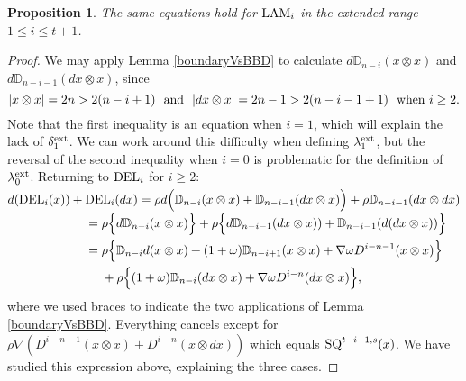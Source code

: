 \documentclass[11pt]{amsart} \renewcommand{\baselinestretch}{1.2}
\theoremstyle{plain}
\newtheorem{prop}[thm]{Proposition}
\theoremstyle{definition}
\newcommand{\twist}{\omega}
\newcommand{\Nabla}{\nabla}
\begin{document}
\begin{second quadrant homotopy sseq operations}
\begin{prop}
The same equations hold for $\textup{LAM}_i$ in the extended range $1\leq i\leq t+1$.
\end{prop}
\begin{proof}
We may apply Lemma \ref{boundaryVsBBD} to calculate $d\mathbb{D}_{n-i}(x\otimes x)$ and $d\mathbb{D}_{n-i-1}(dx\otimes x)$, since 
\[|x\otimes x|=2n> 2(n-i+1)\textup{ \ and \ }|dx\otimes x|=2n-1> 2(n-i-1+1) \textup{ \ when $i\geq2$}.\]
Note that the first inequality is an equation when  $i=1$, which will explain the lack of $\delta^\textup{ext}_1$. We can work around this difficulty when defining $\lambda^\textup{ext}_1$, but the reversal of the second inequality when $i=0$ is problematic for the definition of $\lambda^\textup{ext}_0$. Returning to $\textup{DEL}_i$ for $i\geq2$:
\begin{alignat*}{2}
d(\textup{DEL}_i(x))+{}& \textup{DEL}_i(dx)
=
\smash{\rho d\Bigl(\mathbb{D}_{n-i}(x\otimes x)+\mathbb{D}_{n-i-1}(dx\otimes x)\Bigr)}+\rho\mathbb{D}_{n-i-1}(dx\otimes dx)%
\\
&=
\rho\Bigl\{d\mathbb{D}_{n-i}(x\otimes x)\Bigr\}+\rho\Bigl\{d\mathbb{D}_{n-i-1}(dx\otimes x))+\mathbb{D}_{n-i-1}(d(dx\otimes x))\Bigr\}%
\\
&=
\rho\Bigl\{\mathbb{D}_{n-i}d(x\otimes x)+(1+\twist)\mathbb{D}_{n-i+1}(x\otimes x)+\Nabla\twist D^{i-n-1}(x\otimes x)\Bigr\}
\\
&\ \ \ \ +\rho\Bigl\{(1+\twist)\mathbb{D}_{n-i}(dx\otimes x)+\Nabla\twist D^{i-n}(dx\otimes x)\Bigr\},
\end{alignat*}
where we used braces to indicate the two applications of Lemma \ref{boundaryVsBBD}.
Everything cancels except for $\rho\Nabla(D^{i-n-1}(x\otimes x)+D^{i-n}(x\otimes dx))$ which equals $\textup{SQ}^{t-i+1,s}(x)$. We have studied this expression above, explaining the three cases.


\end{proof}
\end{second quadrant homotopy sseq operations}
\end{document}

